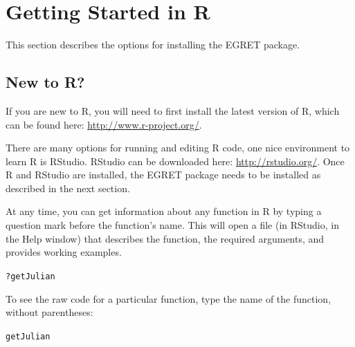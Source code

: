 \documentclass[a4paper,11pt]{article}\usepackage[]{graphicx}\usepackage[]{color}
\makeatletter
\newcommand{\hlopt}[1]{\textcolor[rgb]{0,0,0}{#1}}%
\newcommand{\hlstd}[1]{\textcolor[rgb]{0.345,0.345,0.345}{#1}}%
\newenvironment{kframe}{%
 \def\at@end@of@kframe{}%
 \ifinner\ifhmode%
  \def\at@end@of@kframe{\end{minipage}}%
  \begin{minipage}{\columnwidth}%
 \fi\fi%
 \def\FrameCommand##1{\hskip\@totalleftmargin \hskip-\fboxsep
 \colorbox{shadecolor}{##1}\hskip-\fboxsep
     \hskip-\linewidth \hskip-\@totalleftmargin \hskip\columnwidth}%
 \MakeFramed {\advance\hsize-\width
   \@totalleftmargin\z@ \linewidth\hsize
   \@setminipage}}%
 {\par\unskip\endMakeFramed%
 \at@end@of@kframe}
\newenvironment{knitrout}{}{} %
\makeatother
\begin{document}
\section{Getting Started in R}
\label{sec:appendix1}
This section describes the options for installing the EGRET package.

\subsection{New to R?}
If you are new to R, you will need to first install the latest version of R, which can be found here: \url{http://www.r-project.org/}.

There are many options for running and editing R code, one nice environment to learn R is RStudio. RStudio can be downloaded here: \url{http://rstudio.org/}. Once R and RStudio are installed, the EGRET package needs to be installed as described in the next section.

At any time, you can get information about any function in R by typing a question mark before the function's name.  This will open a file (in RStudio, in the Help window) that describes the function, the required arguments, and provides working examples.

\begin{knitrout}
\color{fgcolor}\begin{kframe}
\begin{alltt}
\hlopt{?}\hlstd{getJulian}
\end{alltt}
\end{kframe}
\end{knitrout}


To see the raw code for a particular function, type the name of the function, without parentheses:
\begin{knitrout}
\color{fgcolor}\begin{kframe}
\begin{alltt}
\hlstd{getJulian}
\end{alltt}
\end{kframe}
\end{knitrout}



\end{document}
